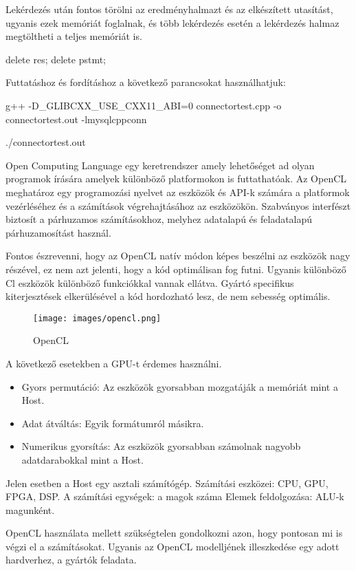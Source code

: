 Lekérdezés után fontos törölni az eredményhalmazt és az elkészített utasítást, ugyanis ezek memóriát foglalnak, és több lekérdezés esetén a lekérdezés halmaz megtöltheti a teljes memóriát is. 
\begin{cpp}
    delete res;
    delete pstmt;
\end{cpp}
Futtatáshoz és fordításhoz a következő parancsokat használhatjuk: 
\begin{python}
g++ -D_GLIBCXX_USE_CXX11_ABI=0 connectortest.cpp -o connectortest.out 
-lmysqlcppconn

./connectortest.out
\end{python}



Open Computing Language egy keretrendszer amely lehetőséget ad olyan programok írására amelyek különböző platformokon is futtathatóak.
Az OpenCL meghatároz egy programozási nyelvet az eszközök és API-k számára a platformok vezérléséhez és a számítások végrehajtásához az eszközökön. Szabványos interfészt biztosít a párhuzamos számításokhoz, melyhez adatalapú és feladatalapú párhuzamosítást használ.

Fontos észrevenni, hogy az OpenCL natív módon képes beszélni az eszközök nagy részével, ez nem azt jelenti, hogy a kód optimálisan fog futni. Ugyanis különböző Cl eszközök különböző funkciókkal vannak ellátva. Gyártó specifikus kiterjesztések elkerülésével a kód hordozható lesz, de nem sebesség optimális.

\begin{figure}[h!]
\centering
\texttt{[image: images/opencl.png]}
\caption{OpenCL}
\label{fig:opencl}
\end{figure}

A következő esetekben a GPU-t érdemes használni.
\begin{itemize}
\item Gyors permutáció: Az eszközök gyorsabban mozgatáják a memóriát mint a Host.
\item Adat átváltás: Egyik formátumról másikra.
\item Numerikus gyorsítás: Az eszközök gyorsabban számolnak nagyobb adatdarabokkal mint a Host.
\end{itemize}
Jelen esetben a Host egy asztali számítógép.
Számítási eszközei: CPU, GPU, FPGA, DSP.
A számítási egységek: a magok száma
Elemek feldolgozása: ALU-k magunként.

OpenCL használata mellett szükségtelen gondolkozni azon, hogy pontosan mi is végzi el a számításokat. Ugyanis az OpenCL modelljének illeszkedése egy adott hardverhez, a gyártók feladata.

